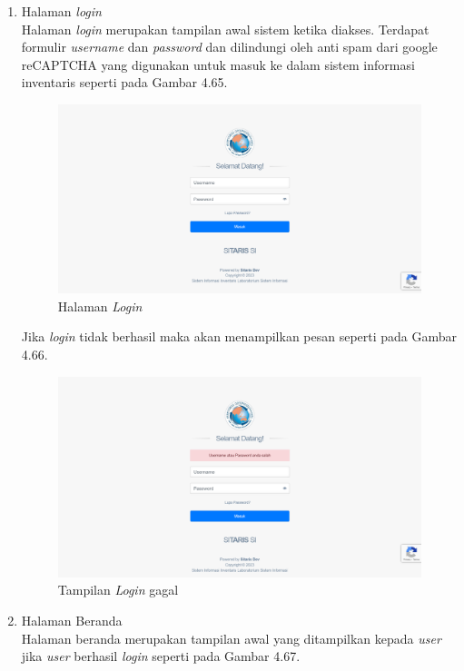 \begin{enumerate}
  \item Halaman \textit{login} \\ Halaman \textit{login} merupakan tampilan awal sistem ketika diakses. Terdapat formulir \textit{username} dan \textit{password} dan dilindungi oleh anti spam dari google reCAPTCHA yang digunakan untuk masuk ke dalam sistem informasi inventaris seperti pada Gambar 4.65.

        \begin{figure}
          \centering
          \includegraphics[width=0.82\linewidth]{konten//gambar/Login Page.png}
          \caption{Halaman \textit{Login}}
          \label{fig:enter-label}
        \end{figure}
        Jika \textit{login} tidak berhasil maka akan menampilkan pesan seperti pada Gambar 4.66.

        \begin{figure}
          \centering
          \includegraphics[width=0.82\linewidth]{konten//gambar/login gagal.png}
          \caption{Tampilan \textit{Login} gagal}
          \label{fig:enter-label}
        \end{figure}

  \item Halaman Beranda \\ Halaman beranda merupakan tampilan awal yang ditampilkan kepada \textit{user} jika \textit{user} berhasil \textit{login} seperti pada Gambar 4.67.


\end{enumerate}

